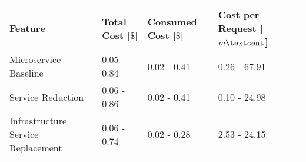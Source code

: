\begin{tabular}{llll}
\toprule
Feature & Total Cost [$\$$] & Consumed Cost [$\$$] & Cost per Request [$m\textcent$] \\
\midrule
Microservice Baseline & 0.05 - 0.84 & 0.02 - 0.41 & 0.26 - 67.91 \\
Service Reduction & 0.06 - 0.86 & 0.02 - 0.41 & 0.10 - 24.98 \\
Infrastructure Service Replacement & 0.06 - 0.74 & 0.02 - 0.28 & 2.53 - 24.15 \\
\bottomrule
\end{tabular}
